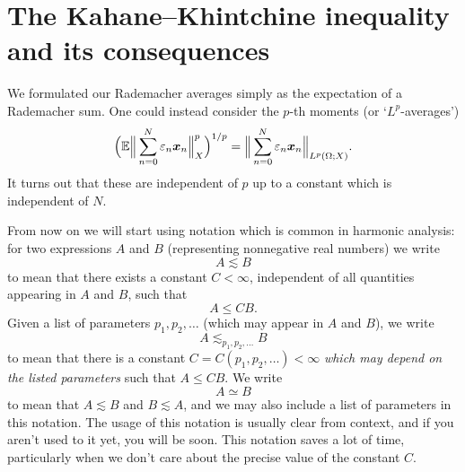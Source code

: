 \section{The Kahane--Khintchine inequality and its consequences}

We formulated our Rademacher averages simply as the expectation of a Rademacher sum.
One could instead consider the $p$-th moments (or `$L^p$-averages')
\begin{equation*}
  \Big( \mathbb{E} \Big\| \sum_{n=0}^{N} \varepsilon_{n} \bm{x}_{n} \Big\|_{X}^{p} \Big)^{1/p} = \Big\| \sum_{n=0}^{N} \varepsilon_{n} \bm{x}_{n} \Big\|_{L^p(\Omega;X)}.
\end{equation*}
It turns out that these are independent of $p$ up to a constant which is independent of $N$.

\begin{rmk}\label{rmk:HA-notation}
  From now on we will start using notation which is common in harmonic analysis: for two expressions $A$ and $B$ (representing nonnegative real numbers) we write
  \begin{equation*}
    A \lesssim B
  \end{equation*}
  to mean that there exists a constant $C < \infty$, independent of all quantities appearing in $A$ and $B$, such that
  \begin{equation*}
    A \leq CB.
  \end{equation*}
  Given a list of parameters $p_{1}, p_{2}, \ldots$ (which may appear in $A$ and $B$), we write
  \begin{equation*}
    A \lesssim_{p_{1}, p_{2}, \ldots} B
  \end{equation*}
  to mean that there is a constant $C = C(p_{1}, p_{2}, \ldots) < \infty$ \emph{which may depend on the listed parameters} such that $A \leq CB$.
  We write
  \begin{equation*}
    A \simeq B
  \end{equation*}
  to mean that $A \lesssim B$ and $B \lesssim A$, and we may also include a list of parameters in this notation.
  The usage of this notation is usually clear from context, and if you aren't used to it yet, you will be soon.
  This notation saves a lot of time, particularly when we don't care about the precise value of the constant $C$.
\end{rmk}

